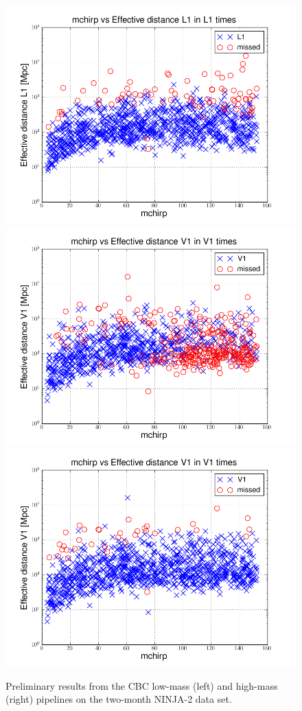 \begin{figure}
  \includegraphics[width=0.5\linewidth]{figures/ninja2/L1-plotinspmissed_HIGH_FULL_DATA_mchirp-eff_dist-log-L1-871147552-5209912.png} \\
  \includegraphics[width=0.5\linewidth]{figures/ninja2/V1-plotinspmissed_LOW_FULL_DATA_mchirp-eff_dist-log-V1-871147552-5209912.png}
  \includegraphics[width=0.5\linewidth]{figures/ninja2/V1-plotinspmissed_HIGH_FULL_DATA_mchirp-eff_dist-log-V1-871147552-5209912.png} \\
  \caption[Preliminary NINJA2 CBC results]{
  \label{f:ninja2_cbc_results}
Preliminary results from the CBC low-mass (left) and high-mass (right)
pipelines on the two-month NINJA-2 data set.
}
\end{figure}%


\noindent {}

\noindent {}

